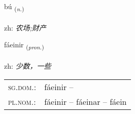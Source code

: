 \documentclass[frontgrid, backgrid]{flacards}\usepackage[]{graphicx}\usepackage[]{color}
\begin{document}
\renewcommand{\flhead}{\vskip5pt \fboxsep=0pt {\small\bfseries\footnotesize Nafnorð | 名词}}
\renewcommand{\fcfoot}{\vskip5pt \fboxsep=0pt \hspace{2pt}{\small\bfseries\footnotesize 2K}}

\renewcommand{\blhead}{\vskip5pt {\small\bfseries\footnotesize Nafnorð | 名词 }}
\renewcommand{\bcfoot}{\vskip5pt \hspace{2pt}{\small\bfseries\footnotesize 2K}}


{bú \small{\textsubscript{(\textit{n.})}} \\[1ex] %
\textphonetic{[puː]} \\
zh: \emph{农场;财产} \\  [2ex]
\renewcommand*{\arraystretch}{0.8}
}

\renewcommand{\flhead}{\vskip5pt \fboxsep=0pt {\small\bfseries\footnotesize Fornafn | 代词}}
\renewcommand{\fcfoot}{\vskip5pt \fboxsep=0pt \hspace{2pt}{\small\bfseries\footnotesize 2K}}

\renewcommand{\blhead}{\vskip5pt {\small\bfseries\footnotesize Fornafn | 代词 }}
\renewcommand{\bcfoot}{\vskip5pt \hspace{2pt}{\small\bfseries\footnotesize 2K}}


{fáeinir \small{\textsubscript{(\textit{pron.})}} \\[1ex] %
\textphonetic{[fauːeinɪr]} \\
zh: \emph{少数，一些} \\  [2ex]
\renewcommand*{\arraystretch}{0.8}
\begin{tabular}{ll}
\textsc{sg.dom.}: & fáeinir  -- \\ 
\textsc{pl.nom.}: & fáeinir -- fáeinar -- fáein
\end{tabular}
}
\end{document}
